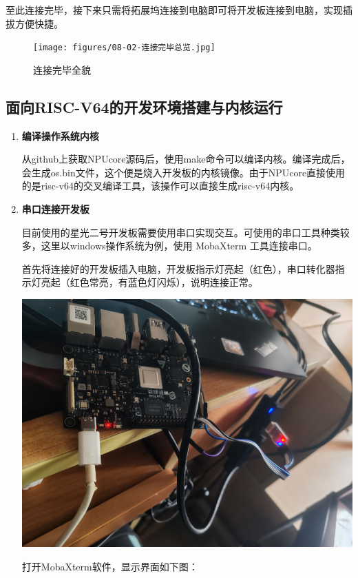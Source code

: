 至此连接完毕，接下来只需将拓展坞连接到电脑即可将开发板连接到电脑，实现插拔方便快捷。

\begin{figure}[htb]
	\centering
	\texttt{[image: figures/08-02-连接完毕总览.jpg]}
	\caption{
		连接完毕全貌
	}
	\label{fig:pipe}
\end{figure}


\subsection{面向RISC-V64的开发环境搭建与内核运行}
{
\begin{enumerate}
	\item \textbf{编译操作系统内核}
	
	从github上获取NPUcore源码后，使用make命令可以编译内核。编译完成后，会生成os.bin文件，这个便是烧入开发板的内核镜像。由于NPUcore直接使用的是risc-v64的交叉编译工具，该操作可以直接生成risc-v64内核。
	
	\item \textbf{串口连接开发板}
	
	目前使用的星光二号开发板需要使用串口实现交互。可使用的串口工具种类较多，这里以windows操作系统为例，使用
	MobaXterm 工具连接串口。
	
	首先将连接好的开发板插入电脑，开发板指示灯亮起（红色），串口转化器指示灯亮起（红色常亮，有蓝色灯闪烁），说明连接正常。
	~~
	
	\centering
	\includegraphics[width=0.9\linewidth]{figures/08-02-星光二号线路.jpg}
	
	
	\raggedright
	
	
	打开MobaXterm软件，显示界面如下图：
	

\end{enumerate}}
